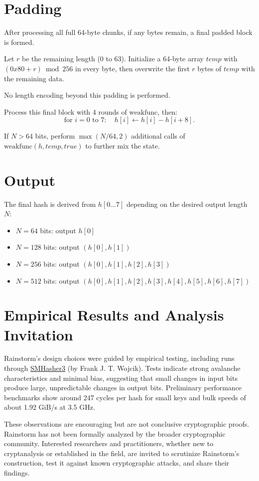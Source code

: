 \documentclass[11pt,a4paper]{article}
\begin{document}
\section*{Padding}
After processing all full 64-byte chunks, if any bytes remain, a final padded block is formed.

Let $r$ be the remaining length (0 to 63). Initialize a 64-byte array $temp$ with $(0x80 + r) \bmod 256$ in every byte, then overwrite the first $r$ bytes of $temp$ with the remaining data.

No length encoding beyond this padding is performed.

Process this final block with 4 rounds of $\text{weakfunc}$, then:
\[
\text{for } i=0 \text{ to } 7:\quad h[i] \leftarrow h[i] - h[i+8].
\]

If $N > 64$ bits, perform $\max(N/64, 2)$ additional calls of $\text{weakfunc}(h, temp, true)$ to further mix the state.

\section*{Output}
The final hash is derived from $h[0 \ldots 7]$ depending on the desired output length $N$:

\begin{itemize}
  \item $N=64$ bits: output $h[0]$
  \item $N=128$ bits: output $(h[0], h[1])$
  \item $N=256$ bits: output $(h[0], h[1], h[2], h[3])$
  \item $N=512$ bits: output $(h[0], h[1], h[2], h[3], h[4], h[5], h[6], h[7])$
\end{itemize}


\section*{Empirical Results and Analysis Invitation}
Rainstorm’s design choices were guided by empirical testing, including runs through \href{https://gitlab.com/fwojcik/smhasher3}{SMHasher3} (by Frank J. T. Wojcik). Tests indicate strong avalanche characteristics and minimal bias, suggesting that small changes in input bits produce large, unpredictable changes in output bits. Preliminary performance benchmarks show around 247 cycles per hash for small keys and bulk speeds of about 1.92 GiB/s at 3.5 GHz.

These observations are encouraging but are not conclusive cryptographic proofs. Rainstorm has not been formally analyzed by the broader cryptographic community. Interested researchers and practitioners, whether new to cryptanalysis or established in the field, are invited to scrutinize Rainstorm’s construction, test it against known cryptographic attacks, and share their findings.
\end{document}
